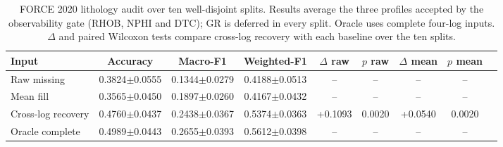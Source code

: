 \begin{table}
\caption{FORCE 2020 lithology audit over ten well-disjoint splits. Results
average the three profiles accepted by the observability gate (RHOB, NPHI and
DTC); GR is deferred in every split. Oracle uses complete four-log inputs.
$\Delta$ and paired Wilcoxon tests compare cross-log recovery with each
baseline over the ten splits.}
\label{tab:downstream}
\centering
\footnotesize
\begin{tabular*}{\textwidth}{@{\extracolsep{\fill}}lcccccccc@{}}
\toprule
Input & Accuracy & Macro-F1 & Weighted-F1 &
$\Delta$ raw & $p$ raw & $\Delta$ mean & $p$ mean \\
\midrule
Raw missing & 0.3824$\pm$0.0555 & 0.1344$\pm$0.0279 & 0.4188$\pm$0.0513 & -- & -- & -- & -- \\
Mean fill & 0.3565$\pm$0.0450 & 0.1897$\pm$0.0260 & 0.4167$\pm$0.0432 & -- & -- & -- & -- \\
Cross-log recovery & 0.4760$\pm$0.0437 & 0.2438$\pm$0.0367 & 0.5374$\pm$0.0363 & +0.1093 & 0.0020 & +0.0540 & 0.0020 \\
Oracle complete & 0.4989$\pm$0.0443 & 0.2655$\pm$0.0393 & 0.5612$\pm$0.0398 & -- & -- & -- & -- \\
\bottomrule
\end{tabular*}
\end{table}
